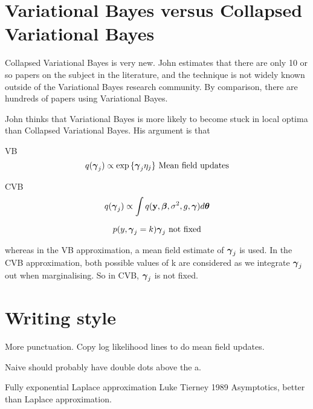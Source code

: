 \documentclass{amsart}
\begin{document}
\section{Variational Bayes versus Collapsed Variational Bayes}

Collapsed Variational Bayes is very new. John estimates that there are only 10 or so papers on the subject in
the literature, and the technique is not widely known outside of the Variational Bayes research community. By
comparison, there are hundreds of papers using Variational Bayes.

John thinks that Variational Bayes is more likely to become stuck in local optima than Collapsed Variational
Bayes. His argument is that

VB
$$q({\boldsymbol \gamma}_j) \propto \exp{ \{ {\boldsymbol\gamma}_j \eta_j \} } \text{ Mean field updates}$$

CVB
$$q({\boldsymbol \gamma}_j) \propto \int q({\bf y}, {\boldsymbol \beta}, \sigma^2, g, {\boldsymbol \gamma}) d {\boldsymbol \theta}$$

$$p(y, {\boldsymbol \gamma}_j = k) {\boldsymbol \gamma}_j\text{ not fixed}$$

whereas in the VB approximation, a mean field estimate of ${\boldsymbol \gamma}_j$ is used. In the CVB approximation, both
possible values of k are considered as we integrate ${\boldsymbol \gamma}_j$ out when marginalising. So in CVB, ${\boldsymbol \gamma}_j$
is not fixed.

\section{Writing style}
More punctuation.
Copy log likelihood lines to do mean field updates.

Naive should probably have double dots above the a.

Fully exponential Laplace approximation Luke Tierney 1989 Asymptotics, better than Laplace approximation.
\end{document}

